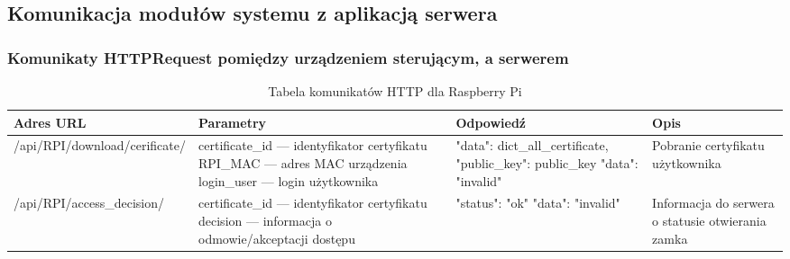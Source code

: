 \newpage
\subsection{Komunikacja modułów systemu z aplikacją  serwera}
	\newpage
	\begin{landscape}
			\subsubsection{Komunikaty HTTPRequest pomiędzy urządzeniem sterującym, a serwerem}

		
		\begin{longtable}[!ht]{|p{5cm}|p{6cm}|p{6.5cm}|p{3cm}|} 
			\caption{Tabela komunikatów HTTP dla Raspberry Pi}
			\label{tab:http_raspberry}\\
			\hline	
			Adres URL & Parametry & Odpowiedź & Opis \\	\hline
			/api/RPI/download/cerificate/ & certificate\_id --- identyfikator certyfikatu \newline RPI\_MAC --- adres MAC urządzenia \newline login\_user --- login użytkownika & "data": dict\_all\_certificate, "public\_key": public\_key \tablinia "data": "invalid" & Pobranie certyfikatu użytkownika \\ \hline
			/api/RPI/access\_decision/ & certificate\_id --- identyfikator certyfikatu \newline decision --- informacja o odmowie/akceptacji dostępu & "status": "ok" \tablinia "data": "invalid" & Informacja do serwera o statusie otwierania zamka \\ \hline
		\end{longtable}
	\end{landscape}
\newpage
